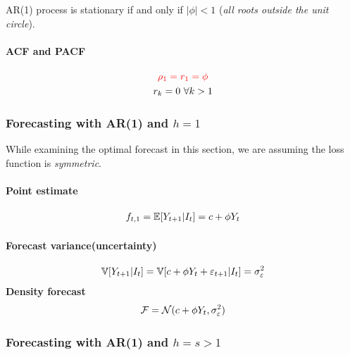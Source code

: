\documentclass[11pt]{article}
\begin{document}
		\begin{proposition}
			AR(1) process is stationary if and only if $|\phi| < 1$ (\emph{all roots outside the unit circle}).
		\end{proposition}
		
		\paragraph{ACF and PACF}
			\begin{gather}
				\textcolor{red}{\rho_1 = r_1 = \phi} \\
				r_k = 0\ \forall k > 1
			\end{gather}
			
		\subsubsection{Forecasting with AR(1) and $h=1$}
			\begin{assumption}
				While examining the optimal forecast in this section, we are assuming the loss function is \emph{symmetric}.
			\end{assumption}
			
			\paragraph{Point estimate}
				\begin{gather}
					f_{t,1} = \mathbb{E}[{Y_{t+1}|I_t}]
					= c + \phi Y_t
				\end{gather}
			\paragraph{Forecast variance(uncertainty)}
				\begin{gather}
					\mathbb{V}[{Y_{t+1}|I_t}] = \mathbb{V}[{c + \phi Y_t + \varepsilon_{t+1}|I_t}]
					= \sigma_\varepsilon^2
				\end{gather}
			\textbf{Density forecast}
				\begin{gather}
					\mathcal{{F}} = \mathcal{{N}}(c + \phi Y_t, \sigma_\varepsilon^2)
				\end{gather}
				
		\subsubsection{Forecasting with AR(1) and $h=s>1$}
\end{document}

